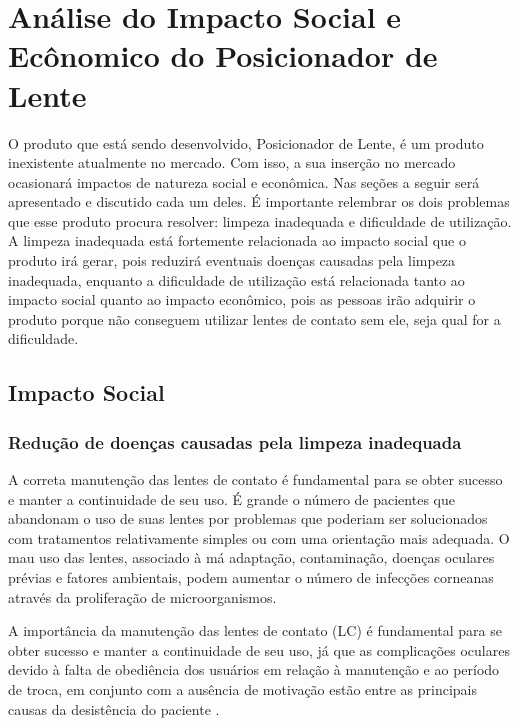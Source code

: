
\chapter[Análise do Impacto Social e Ecônomico do Posicionador de Lente]{Análise do Impacto Social e Ecônomico do Posicionador de Lente}

O produto que está sendo desenvolvido, Posicionador de Lente, é um produto inexistente atualmente no mercado. Com isso, a sua inserção no mercado ocasionará impactos de natureza
social e econômica. Nas seções a seguir será apresentado e discutido cada um deles. É importante relembrar os dois problemas que esse produto procura resolver: limpeza inadequada e dificuldade de utilização. A limpeza inadequada está fortemente relacionada ao impacto social que o produto irá gerar,  pois reduzirá eventuais doenças causadas pela limpeza inadequada, enquanto a dificuldade de utilização está relacionada tanto ao impacto social quanto ao impacto econômico, pois as pessoas irão adquirir o produto porque não conseguem utilizar lentes de contato sem ele, seja qual for a dificuldade.

\section[Impacto Social]{Impacto Social}

\subsection[Redução de doenças causadas pela limpeza inadequada]{Redução de doenças causadas pela limpeza inadequada}

A correta manutenção das lentes de contato é fundamental para se obter
sucesso e manter a continuidade de seu uso. É grande o número de
pacientes que abandonam o uso de suas lentes por problemas que poderiam
ser solucionados com tratamentos relativamente simples ou com uma
orientação mais adequada. O mau uso das lentes, associado à má adaptação,
contaminação, doenças oculares prévias e fatores ambientais, podem
aumentar o número de infecções corneanas através da proliferação de
microorganismos. 

A importância da manutenção das lentes de contato (LC) é fundamental
para se obter sucesso e manter a continuidade de seu uso, já que as
complicações oculares devido à falta de obediência dos usuários em relação
à manutenção e ao período de troca, em conjunto com a ausência de
motivação estão entre as principais causas da desistência do paciente \cite{coral}.


